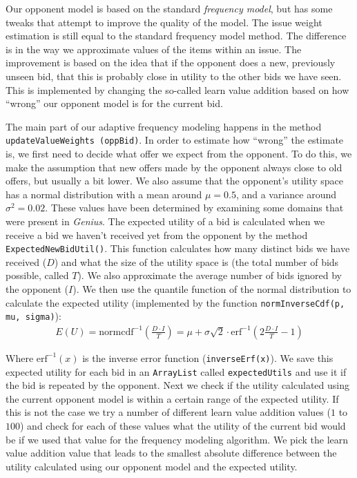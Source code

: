 Our opponent model is based on the standard \emph{frequency model}, but has some tweaks that attempt to improve the quality of the model. The issue weight estimation is still equal to the standard frequency model method. The difference is in the way we approximate values of the items within an issue. The improvement is based on the idea that if the opponent does a new, previously unseen bid, that this is probably close in utility to the other bids we have seen. This is implemented by changing the so-called learn value addition based on how ``wrong'' our opponent model is for the current bid. 

The main part of our adaptive frequency modeling happens in the method \texttt{updateValueWeights (oppBid)}.
In order to estimate how ``wrong'' the estimate is, we first need to decide what offer we expect from the opponent.
To do this, we make the assumption that new offers made by the opponent always close to old offers, but usually a bit lower. 
We also assume that the opponent's utility space has a normal distribution with a mean around $\mu = 0.5$, and a variance around $\sigma^2 = 0.02$. 
These values have been determined by examining some domains that were present in \textit{Genius}. 
The expected utility of a bid is calculated when we receive a bid we haven't received yet from the opponent by the method \verb-ExpectedNewBidUtil()-. This function calculates how many distinct bids we have received ($D$) and what the size of the utility space is (the total number of bids possible, called $T$). We also approximate the average number of bids ignored by the opponent ($I$). We then use the quantile function of the normal distribution to calculate the expected utility (implemented by the function \verb-normInverseCdf(p, mu, sigma)-):
\begin{align}
  E(U) = \text{normcdf}^{-1} \left(\frac{D \cdot I}{T}\right) = \mu + \sigma \sqrt{2} \cdot \text{erf}^{-1} \left(2 \frac{D \cdot I}{T} - 1\right)
\end{align}

Where $\text{erf}^{-1}(x)$ is the inverse error function (\verb-inverseErf(x)-). 
We save this expected utility for each bid in an \verb-ArrayList- called \verb-expectedUtils- and use it if the bid is repeated by the opponent. 
Next we check if the utility calculated using the current opponent model is within a certain range of the expected utility. 
If this is not the case we try a number of different learn value addition values ($1$ to $100$) and check for each of these values what the utility of the current bid would be if we used that value for the frequency modeling algorithm. 
We pick the learn value addition value that leads to the smallest absolute difference between the utility calculated using our opponent model and the expected utility. 

